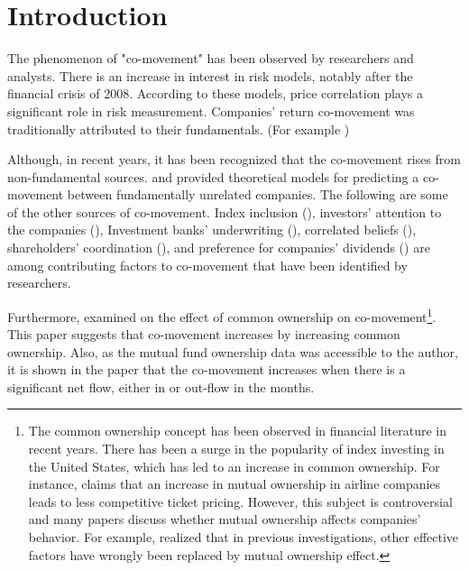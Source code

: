 \section{Introduction}

	{The phenomenon of "co-movement" has been observed by researchers and analysts. There is an increase in interest in risk models, notably after the financial crisis of 2008. According to these models, price correlation plays a significant role in risk measurement. Companies' return co-movement was traditionally attributed to their fundamentals. (For example {\cite{shiller1989comovements}})} 
	
	Although, in recent years, it has been recognized that the co-movement rises from non-fundamental sources. {\cite{barberis2003style} and \cite{barberis2005comovement}} provided theoretical models for predicting a co-movement between fundamentally unrelated companies.
	The following are some of the other sources of co-movement. Index inclusion ({\cite{barberis2005comovement}}), investors' attention to the companies ({\cite{wu2014investor}}), Investment banks' underwriting ({\cite{grullon2014comovement}}), correlated beliefs ({\cite{david2016correlated}}), shareholders' coordination ({\cite{pantzalis2017shareholder}}), and preference for companies' dividends ({\cite{HAMEED2019103}}) are among contributing factors to co-movement that have been identified by researchers.
	
	
	Furthermore, {\cite{AntonPolk}} examined on the effect of common ownership on co-movement\footnote{The common ownership concept has been observed in financial literature in recent years. There has been a surge in the popularity of index investing in the United States, which has led to an increase in common ownership. 
		For instance, \cite{azar2018anticompetitive} claims that an increase in mutual ownership in airline companies leads to less competitive ticket pricing. However, this subject is controversial and many papers discuss whether mutual ownership affects companies' behavior.
		For example, \cite{lewellen2021does} realized that in previous investigations, other effective factors have wrongly been replaced by mutual ownership effect.
	}. 
	This paper suggests that co-movement increases by increasing common ownership. Also, as the mutual fund ownership data was accessible to the author, it is shown in the paper that the  co-movement increases when there is a significant net flow, either in or out-flow in the months.
	
